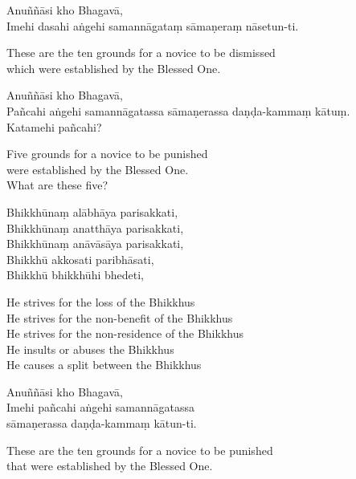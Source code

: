 Anuññāsi kho Bhagavā,\\
Imehi dasahi aṅgehi samannāgataṃ sāmaṇeraṃ nāsetun-ti.

\begin{english}
  These are the ten grounds for a novice to be dismissed\\
  which were established by the Blessed One.
\end{english}


Anuññāsi kho Bhagavā,\\
Pañcahi aṅgehi samannāgatassa sāmaṇerassa daṇḍa-kammaṃ kātuṃ.\\
Katamehi pañcahi?

\begin{english}
  Five grounds for a novice to be punished\\
  were established by the Blessed One.\\
  What are these five?
\end{english}

Bhikkhūnaṃ alābhāya parisakkati,\\
Bhikkhūnaṃ anatthāya parisakkati,\\
Bhikkhūnaṃ anāvāsāya parisakkati,\\
Bhikkhū akkosati paribhāsati,\\
Bhikkhū bhikkhūhi bhedeti,

\clearpage

\begin{english}
  He strives for the loss of the Bhikkhus\\
  He strives for the non-benefit of the Bhikkhus\\
  He strives for the non-residence of the Bhikkhus\\
  He insults or abuses the Bhikkhus\\
  He causes a split between the Bhikkhus
\end{english}

Anuññāsi kho Bhagavā,\\
Imehi pañcahi aṅgehi samannāgatassa\\
sāmaṇerassa daṇḍa-kammaṃ kātun-ti.

\begin{english}
  These are the ten grounds for a novice to be punished\\
  that were established by the Blessed One.
\end{english}


